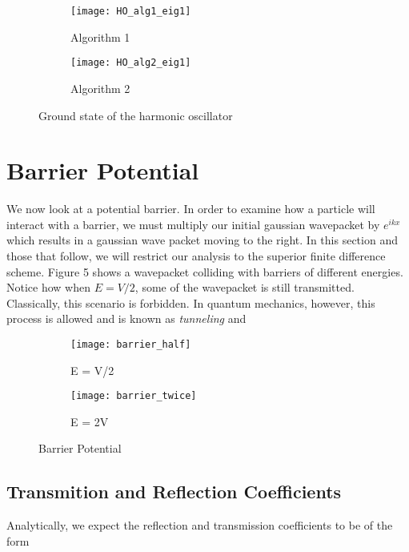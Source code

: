 \documentclass{article}
\begin{document}
\begin{figure}
\centering
\begin{subfigure}[h!]{0.3\textwidth}
\centering
\texttt{[image: HO\_alg1\_eig1]}
\caption{Algorithm 1}
\end{subfigure}
%
\begin{subfigure}[h!]{0.3\textwidth}
\centering
\texttt{[image: HO\_alg2\_eig1]}
\caption{Algorithm 2}
\end{subfigure}

\caption{Ground state of the harmonic oscillator}
\end{figure}

\section{Barrier Potential}

We now look at a potential barrier. In order to examine how a particle will interact with a barrier, we must multiply our initial gaussian wavepacket 
by $e^{ikx}$ which results in a gaussian wave packet moving to the right. In this section and those that follow, we will restrict our analysis to the superior finite difference scheme. Figure 5 shows a wavepacket colliding with barriers of different energies. Notice how when $ E = V/2 $, some of the wavepacket is still transmitted. Classically, this scenario is forbidden. In quantum mechanics, however, this process is allowed and is known as {\it tunneling} and 


\begin{figure}
\centering
\begin{subfigure}[h!]{0.3\textwidth}
\centering
\texttt{[image: barrier\_half]}
\caption{E = V/2}
\end{subfigure}
%
\begin{subfigure}[h!]{0.3\textwidth}
\centering
\texttt{[image: barrier\_twice]}
\caption{E = 2V}
\end{subfigure}

\caption{Barrier Potential}
\end{figure}


\subsection{Transmition and Reflection Coefficients}

Analytically, we expect the reflection and transmission coefficients to be of the form
\end{document}
